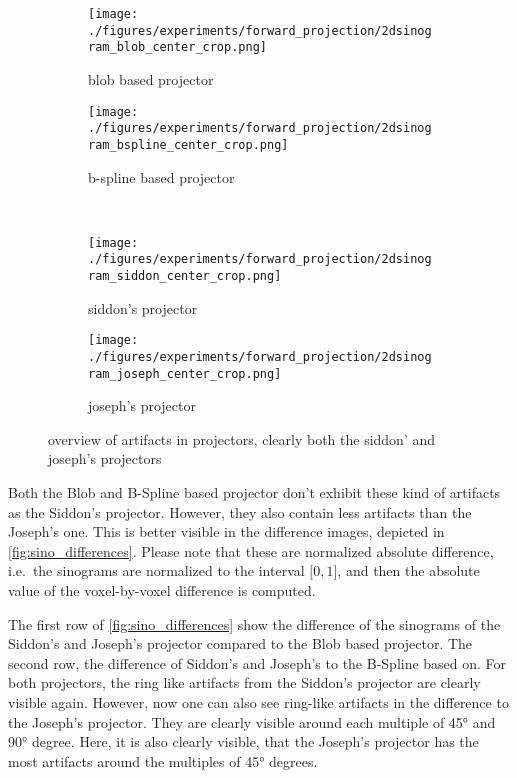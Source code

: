 \begin{figure}[h]
	\centering
	\begin{subfigure}[b]{0.45\textwidth}
		\centering
		\texttt{[image: ./figures/experiments/forward\_projection/2dsinogram\_blob\_center\_crop.png]}
		\caption{blob based projector}\label{fig:sinogram_blob_center_crop}
	\end{subfigure}
	\begin{subfigure}[b]{0.45\textwidth}
		\centering
		\texttt{[image: ./figures/experiments/forward\_projection/2dsinogram\_bspline\_center\_crop.png]}
		\caption{b-spline based projector}\label{fig:sinogram_bspline_center_crop}
	\end{subfigure} \\
	\begin{subfigure}[b]{0.45\textwidth}
		\centering
		\texttt{[image: ./figures/experiments/forward\_projection/2dsinogram\_siddon\_center\_crop.png]}
		\caption{siddon's projector}\label{fig:sinogram_siddon_center_crop}
	\end{subfigure}
	\begin{subfigure}[b]{0.45\textwidth}
		\centering
		\texttt{[image: ./figures/experiments/forward\_projection/2dsinogram\_joseph\_center\_crop.png]}
		\caption{joseph's projector}\label{fig:sinogram_joseph_center_crop}
	\end{subfigure}
	\caption{overview of artifacts in projectors, clearly both the siddon' and joseph's projectors}%
	\label{fig:sinogram_shepp_logan_center_crop}
\end{figure}

Both the Blob and B-Spline based projector don't exhibit these kind of artifacts as the Siddon's
projector. However, they also contain less artifacts than the Joseph's one. This is better visible
in the difference images, depicted in \autoref{fig:sino_differences}. Please note that these are
normalized absolute difference, i.e.\ the sinograms are normalized to the interval \(\mathopen[0,
	1\mathclose]\), and then the absolute value of the voxel-by-voxel difference is computed.

The first row of \autoref{fig:sino_differences} show the difference of the sinograms of the Siddon's
and Joseph's projector compared to the Blob based projector. The second row, the difference of
Siddon's and Joseph's to the B-Spline based on. For both projectors, the ring like artifacts from
the Siddon's projector are clearly visible again. However, now one can also see ring-like artifacts
in the difference to the Joseph's projector. They are clearly visible around each multiple of 45°
and 90° degree. Here, it is also clearly visible, that the Joseph's projector has the most artifacts
around the multiples of 45° degrees.

